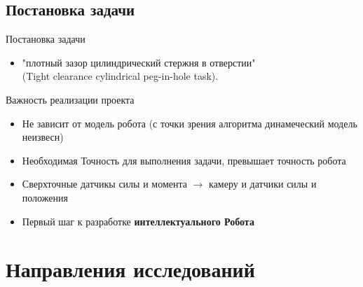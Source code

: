 \documentclass{beamer}
\begin{document}
\subsection{Постановка задачи}
\begin{frame}{Постановка задачи}
    \begin{itemize}
        \item "плотный зазор цилиндрический стержня в отверстии" \\ (Tight clearance cylindrical peg-in-hole task).
    \end{itemize}
    \begin{figure}[h]%
    \centering
    \qquad
    \end{figure}
\end{frame}

\begin{frame}{Важность реализации проекта}
    \begin{itemize}
        \item Не зависит от модель робота (с точки зрения алгоритма динамеческий модель неизвесн)
        \item Необходимая Точность для выполнения задачи, превышает точность робота
        \item Сверхточные датчикы силы и момента  $\rightarrow $ камеру и датчики силы и положения
        \item Первый шаг к разработке \textbf{интеллектуального Робота }
    \end{itemize}
\end{frame}

\section{Направления исследований}
\end{document}
